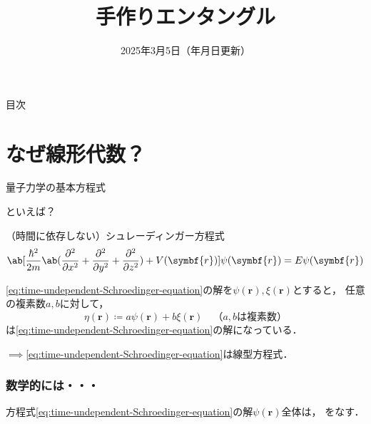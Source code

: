 \documentclass[
    10pt,
    ]{sotsu-beamer}
\begin{document}
\title{手作りエンタングル}
\date{2025年3月5日（\number\year 年\number\month 月\number\day 日更新）}


\begin{frame}

    \maketitle

\end{frame}


\begin{frame}[allowframebreaks]{目次}

    \tableofcontents

\end{frame}


\section{なぜ線形代数？}


\begin{frame}{量子力学の基本方程式}

    といえば？

    \pause

    \begin{block}{（時間に依存しない）シュレーディンガー方程式}
        \begin{equation}
            \label{eq:time-undependent-Schroedinger-equation}
            \ab[ \frac{\hbar^2}{2m} \ab( \pdv[2]{}{x} + \pdv[2]{}{y} + \pdv[2]{}{z} ) + V(\symbf{r})] \psi(\symbf{r}) = E \psi(\symbf{r})
        \end{equation}
    \end{block}

    \pause
    
    \eqref{eq:time-undependent-Schroedinger-equation}の解を$\psi(\symbf{r}), \xi(\symbf{r})$とすると，
    任意の複素数$a, b$に対して，
    \[  \eta(\symbf{r}) \coloneq a \psi(\symbf{r}) + b \xi(\symbf{r}) 
        \quad \text{（$a, b$は複素数）}  \]
    は\eqref{eq:time-undependent-Schroedinger-equation}の解になっている．

    \pause

    $\implies$\alert{\eqref{eq:time-undependent-Schroedinger-equation}は線型方程式}．

\end{frame}



\begin{frame}
    \label{frame:psi-is-vector}
    \frametitle{数学的には・・・}

    \begin{center}
        方程式\eqref{eq:time-undependent-Schroedinger-equation}の解$\psi(\symbf{r})$全体は，
        をなす．
    \end{center}

\end{frame}
\end{document}
